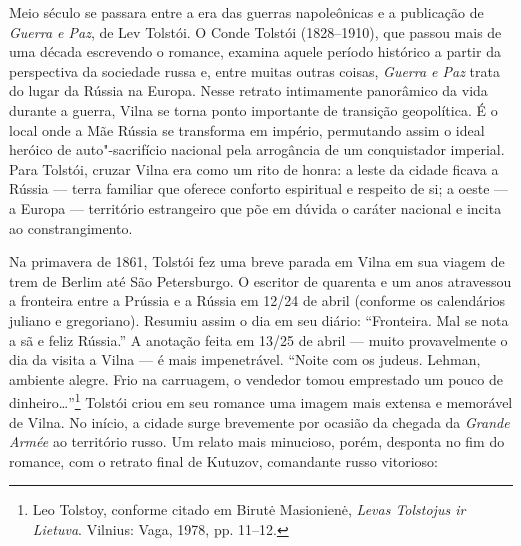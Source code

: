 Meio século se passara entre a era das guerras napoleônicas e a
publicação de \emph{Guerra e Paz}, de Lev Tolstói. O Conde Tolstói
(1828--1910), que passou mais de uma década escrevendo o romance, examina
aquele período histórico a partir da perspectiva da sociedade russa e,
entre muitas outras coisas, \emph{Guerra e Paz} trata do lugar da Rússia
na Europa. Nesse retrato intimamente panorâmico da vida durante a
guerra, Vilna se torna ponto importante de transição geopolítica. É o
local onde a Mãe Rússia se transforma em império, permutando assim o
ideal heróico de auto"-sacrifício nacional pela arrogância de um
conquistador imperial. Para Tolstói, cruzar Vilna era como um rito de
honra: a leste da cidade ficava a Rússia --- terra familiar que oferece
conforto espiritual e respeito de si; a oeste --- a Europa --- território
estrangeiro que põe em dúvida o caráter nacional e incita ao
constrangimento.

Na primavera de 1861, Tolstói fez uma breve parada em Vilna em sua
viagem de trem de Berlim até São Petersburgo. O escritor de quarenta e
um anos atravessou a fronteira entre a Prússia e a Rússia em 12/24 de
abril (conforme os calendários juliano e gregoriano). Resumiu assim o
dia em seu diário: ``Fronteira. Mal se nota a sã e feliz Rússia.'' A
anotação feita em 13/25 de abril --- muito provavelmente o dia da visita a
Vilna --- é mais impenetrável. ``Noite com os judeus. Lehman, ambiente
alegre. Frio na carruagem, o vendedor tomou emprestado um pouco de
dinheiro\ldots{}''\footnote{Leo Tolstoy, conforme citado em Birutė
  Masionienė, \emph{Levas Tolstojus ir Lietuva}. Vilnius: Vaga, 1978,
  pp. 11--12.} Tolstói criou em seu romance uma imagem mais extensa e
memorável de Vilna. No início, a cidade surge brevemente por ocasião da
chegada da \emph{Grande Armée} ao território russo. Um relato mais
minucioso, porém, desponta no fim do romance, com o retrato final de
Kutuzov, comandante russo vitorioso:

